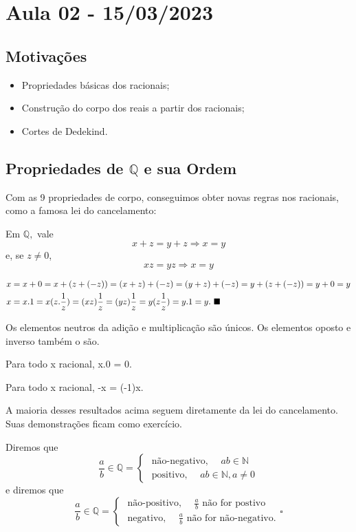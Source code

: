 \documentclass[analysis_notes.tex]{subfiles}
\begin{document}
\section{Aula 02 - 15/03/2023}
\subsection{Motiva\c c\~oes}
\begin{itemize}
	\item Propriedades b\'asicas dos racionais;
	\item Constru\c c\~ao do corpo dos reais a partir dos racionais;
	\item Cortes de Dedekind.
\end{itemize}
\subsection{Propriedades de $\mathbb{Q}$ e sua Ordem}
Com as 9 propriedades de corpo, conseguimos obter novas regras nos racionais, como a famosa lei do cancelamento:
\begin{prop*}
	Em $\mathbb{Q},$ vale
	$$
		x + z = y + z \Rightarrow x = y
	$$
	e, se $z\neq{0}$,
	$$
		xz = yz \Rightarrow x = y
	$$
\end{prop*}
\begin{proof*}
	\begin{align*}
		 & x = x + 0 = x + (z + (-z)) = (x+z) + (-z) = (y + z) + (-z) = y + (z + (-z)) = y +0 = y                           \\
		 & x = x.1 = x(z.\frac{1}{z}) = (xz)\frac{1}{z} = (yz)\frac{1}{z} = y (z \frac{1}{z}) = y.1 = y. \text{ $\blacksquare$}
	\end{align*}
\end{proof*}
\begin{prop*}
	Os elementos neutros da adi\c c\~ao e multiplica\c c\~ao s\~ao \'unicos. Os elementos oposto e inverso tamb\'em o s\~ao.
\end{prop*}
\begin{prop*}
	Para todo x racional, x.0 = 0.
\end{prop*}
\begin{prop*}
	Para todo x racional, -x = (-1)x.
\end{prop*}
A maioria desses resultados acima seguem diretamente da lei do cancelamento. Suas demonstra\c c\~oes ficam como exerc\'icio.
\begin{def*}
	Diremos que
	$$
		\frac{a}{b}\in \mathbb{Q} = \left\{\begin{array}{ll}
			\text{ n\~ao-negativo, } \quad ab\in \mathbb{N} \\
			\text{ positivo, } \quad ab\in \mathbb{N}, a\neq 0
		\end{array}\right.
	$$
	e diremos que
	$$
		\frac{a}{b}\in \mathbb{Q} = \left\{\begin{array}{ll}
			\text{ n\~ao-positivo, } \quad \frac{a}{b} \text{ n\~ao for postivo} \\
			\text{ negativo, } \quad \frac{a}{b} \text{ n\~ao for n\~ao-negativo.}
		\end{array}\right.\square
	$$
\end{def*}
\end{document}
